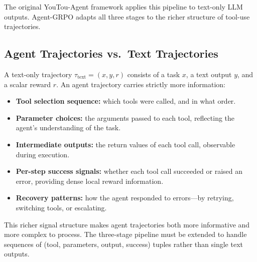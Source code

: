 The original YouTou-Agent framework applies this pipeline to text-only LLM
outputs. Agent-GRPO adapts all three stages to the richer structure of
tool-use trajectories.

\subsection{Agent Trajectories vs.\ Text Trajectories}
\label{sec:traj-comparison}

A text-only trajectory $\tau_{\text{text}} = (x, y, r)$ consists of a task
$x$, a text output $y$, and a scalar reward $r$. An agent trajectory carries
strictly more information:

\begin{itemize}[leftmargin=1.5em]
    \item \textbf{Tool selection sequence:} which tools were called, and in what
          order.
    \item \textbf{Parameter choices:} the arguments passed to each tool,
          reflecting the agent's understanding of the task.
    \item \textbf{Intermediate outputs:} the return values of each tool call,
          observable during execution.
    \item \textbf{Per-step success signals:} whether each tool call succeeded
          or raised an error, providing dense local reward information.
    \item \textbf{Recovery patterns:} how the agent responded to errors---by
          retrying, switching tools, or escalating.
\end{itemize}

This richer signal structure makes agent trajectories both more informative
and more complex to process. The three-stage pipeline must be extended to
handle sequences of (tool, parameters, output, success) tuples rather than
single text outputs.

